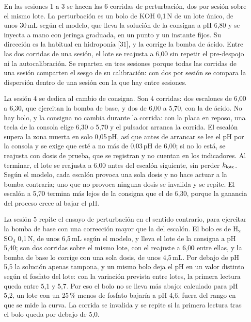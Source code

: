
En las sesiones 1 a 3 se hacen las 6 corridas de perturbación, dos por sesión sobre el mismo lote. La perturbación es un bolo de KOH 0,1\,N de un lote único, de unos 30\,mL según el modelo, que lleva la solución de la consigna a pH 6,80 y se inyecta a mano con jeringa graduada, en un punto y un instante fijos. Su dirección es la habitual en hidroponía [31], y la corrige la bomba de ácido. Entre las dos corridas de una sesión, el lote se reajusta a 6,00 sin repetir el pre-despojo ni la autocalibración. Se reparten en tres sesiones porque todas las corridas de una sesión comparten el sesgo de su calibración: con dos por sesión se compara la dispersión dentro de una sesión con la que hay entre sesiones.

La sesión 4 se dedica al cambio de consigna. Son 4 corridas: dos escalones de 6,00 a 6,30, que ejercitan la bomba de base, y dos de 6,00 a 5,70, con la de ácido. No hay bolo, y la consigna no cambia durante la corrida: con la placa en reposo, una tecla de la consola elige 6,30 o 5,70 y el pulsador arranca la corrida. El escalón supera la zona muerta en solo 0,05\,pH, así que antes de arrancar se lee el pH por la consola y se exige que esté a no más de 0,03\,pH de 6,00; si no lo está, se reajusta con dosis de prueba, que se registran y no cuentan en los indicadores. Al terminar, el lote se reajusta a 6,00 antes del escalón siguiente, sin perder $k_{\text{lote}}$. Según el modelo, cada escalón provoca una sola dosis y no hace actuar a la bomba contraria; uno que no provoca ninguna dosis se invalida y se repite. El escalón a 5,70 termina más lejos de la consigna que el de 6,30, porque la ganancia del proceso crece al bajar el pH.

La sesión 5 repite el ensayo de perturbación en el sentido contrario, para ejercitar la bomba de base con una corrección mayor que la del escalón. El bolo es de H$_2$SO$_4$ 0,1\,N, de unos 6,5\,mL según el modelo, y lleva el lote de la consigna a pH 5,40; son dos corridas sobre el mismo lote, con el reajuste a 6,00 entre ellas, y la bomba de base lo corrige con una sola dosis, de unos 4,5\,mL. Por debajo de pH 5,5 la solución apenas tampona, y un mismo bolo deja el pH en un valor distinto según el fosfato del lote: con la variación prevista entre lotes, la primera lectura queda entre 5,1 y 5,7. Por eso el bolo no se lleva más abajo: calculado para pH 5,2, un lote con un 25\,\% menos de fosfato bajaría a pH 4,6, fuera del rango en que se mide la curva. La corrida se invalida y se repite si la primera lectura tras el bolo queda por debajo de 5,0.


